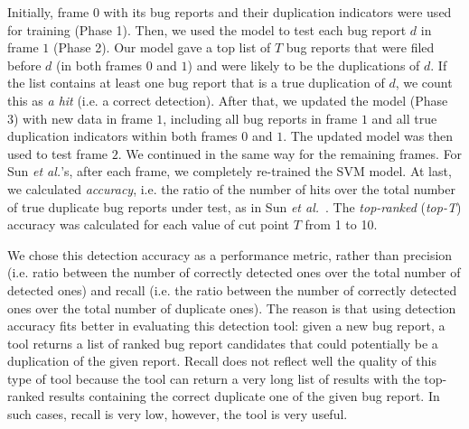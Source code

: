 
Initially, frame $0$ with its bug reports and their duplication
indicators were used for training {\model} (Phase 1). Then, we used
the model to test each bug report $d$ in frame $1$ (Phase 2). Our
model gave a top list of $T$ bug reports that were filed before $d$
(in both frames $0$ and $1$) and were likely to be the duplications of
$d$. If the list contains at least one bug report that is a true
duplication of $d$, we count this as {\em a hit} (i.e. a correct
detection). After that, we updated the model (Phase 3) with new data
in frame $1$, including all bug reports in frame $1$ and all true
duplication indicators within both frames $0$ and $1$. The updated
model was then used to test frame $2$. We continued in the same way
for the remaining frames. For Sun {\em et al.}'s, after each frame, we
completely re-trained the SVM model.
At last, we calculated \emph{accuracy}, i.e. the ratio of the number
of hits over the total number of true duplicate bug reports under
test, as in Sun {\em et al.}~\cite{davidlo10}. The {\em top-ranked}
({\em top-T}) accuracy was calculated for each value of cut point $T$
from 1 to 10.



We chose this detection accuracy as a performance metric, rather than
precision (i.e. ratio between the number of correctly detected ones
over the total number of detected ones) and recall (i.e. the ratio
between the number of correctly detected ones over the total number of
duplicate ones). The reason is that using detection accuracy fits
better in evaluating this detection tool: given a new bug report, a
tool returns a list of ranked bug report candidates that could
potentially be a duplication of the given report.
Recall does not reflect well the quality of this type of tool because
the tool can return a very long list of results with the top-ranked
results containing the correct duplicate one of the given bug
report. In such cases, recall is very low, however, the tool is very
useful.


%

